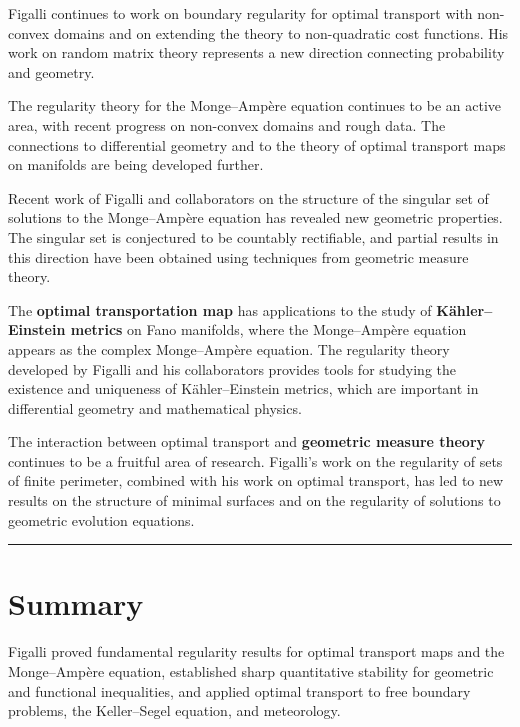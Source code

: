 Figalli continues to work on boundary regularity for optimal transport with non-convex domains and on extending the theory to non-quadratic cost functions. His work on random matrix theory represents a new direction connecting probability and geometry.

The regularity theory for the Monge--Amp\`ere equation continues to be an active area, with recent progress on non-convex domains and rough data. The connections to differential geometry and to the theory of optimal transport maps on manifolds are being developed further.

Recent work of Figalli and collaborators on the structure of the singular set of solutions to the Monge--Amp\`ere equation has revealed new geometric properties. The singular set is conjectured to be countably rectifiable, and partial results in this direction have been obtained using techniques from geometric measure theory.

The \textbf{optimal transportation map} has applications to the study of \textbf{K\"ahler--Einstein metrics} on Fano manifolds, where the Monge--Amp\`ere equation appears as the complex Monge--Amp\`ere equation. The regularity theory developed by Figalli and his collaborators provides tools for studying the existence and uniqueness of K\"ahler--Einstein metrics, which are important in differential geometry and mathematical physics.

The interaction between optimal transport and \textbf{geometric measure theory} continues to be a fruitful area of research. Figalli's work on the regularity of sets of finite perimeter, combined with his work on optimal transport, has led to new results on the structure of minimal surfaces and on the regularity of solutions to geometric evolution equations.

\begin{center}\rule{0.5\linewidth}{0.5pt}\end{center}

\section*{Summary}

Figalli proved fundamental regularity results for optimal transport maps and the Monge--Amp\`ere equation, established sharp quantitative stability for geometric and functional inequalities, and applied optimal transport to free boundary problems, the Keller--Segel equation, and meteorology.
